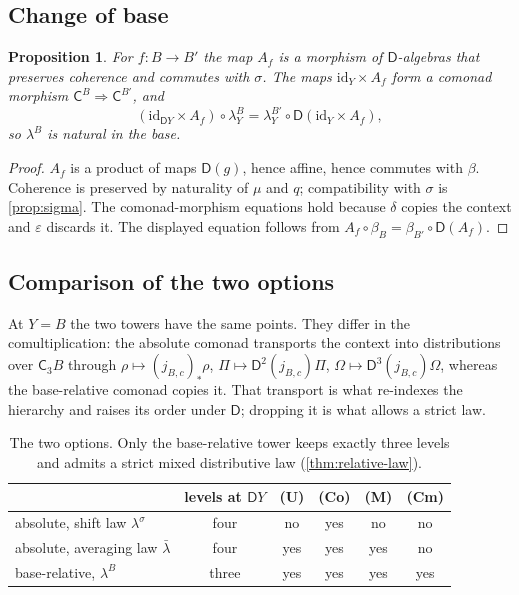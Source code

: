 \documentclass[11pt]{article}
\newtheorem{proposition}[theorem]{Proposition}
\theoremstyle{definition}
\theoremstyle{remark}
\newcommand{\D}{\mathsf{D}}
\newcommand{\C}{\mathsf{C}}
\newcommand{\id}{\mathrm{id}}
\newcommand{\lb}{\bar\lambda}
\newcommand{\ls}{\lambda^{\sigma}}
\begin{document}
\subsection{Change of base}

\begin{proposition}\label{prop:basechange}
For $f\colon B\to B'$ the map $A_f$ is a morphism of $\D$-algebras that preserves coherence and
commutes with $\sigma$. The maps $\id_Y\times A_f$ form a comonad morphism $\C^B\Rightarrow\C^{B'}$, and
\[
(\id_{\D Y}\times A_f)\circ\lambda^B_Y=\lambda^{B'}_Y\circ\D(\id_Y\times A_f),
\]
so $\lambda^B$ is natural in the base.
\end{proposition}
\begin{proof}
$A_f$ is a product of maps $\D(g)$, hence affine, hence commutes with $\beta$. Coherence is preserved
by naturality of $\mu$ and $q$; compatibility with $\sigma$ is \cref{prop:sigma}. The comonad-morphism
equations hold because $\delta$ copies the context and $\varepsilon$ discards it. The displayed
equation follows from $A_f\circ\beta_B=\beta_{B'}\circ\D(A_f)$.
\end{proof}

\subsection{Comparison of the two options}

At $Y=B$ the two towers have the same points. They differ in the comultiplication: the absolute
comonad transports the context into distributions over $\C_3B$ through
$\rho\mapsto(j_{B,c})_*\rho$, $\Pi\mapsto\D^2(j_{B,c})\Pi$, $\Omega\mapsto\D^3(j_{B,c})\Omega$, whereas the
base-relative comonad copies it. That transport is what re-indexes the hierarchy and raises its order
under $\D$; dropping it is what allows a strict law.

\begin{table}[h]
\centering
\begin{tabular}{@{}lccccc@{}}
\toprule
& levels at $\D Y$ & (U) & (Co) & (M) & (Cm)\\
\midrule
absolute, shift law $\ls$ & four & no & yes & no & no\\
absolute, averaging law $\lb$ & four & yes & yes & yes & no\\
base-relative, $\lambda^B$ & three & yes & yes & yes & yes\\
\bottomrule
\end{tabular}
\caption{The two options. Only the base-relative tower keeps exactly three levels and admits a
strict mixed distributive law (\cref{thm:relative-law}).}
\label{tab:options}
\end{table}
\end{document}
